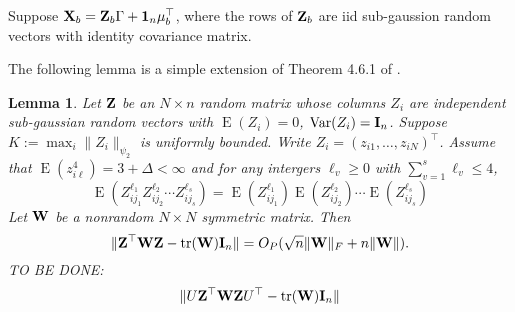 \documentclass[11pt]{article}
\DeclareMathOperator{\mytr}{tr}
\DeclareMathOperator{\myE}{E}
\DeclareMathOperator{\myVar}{Var}
\theoremstyle{plain}
\newtheorem{lemma}{\quad\quad Lemma}
\theoremstyle{definition}
\theoremstyle{remark}
\begin{document}
Suppose $\mathbf{X}_b =\mathbf{Z}_b \Gamma + \mathbf 1_n \mu_b^\top$, where the rows of $\mathbf{Z}_b$ are iid sub-gaussion random vectors with identity covariance matrix.


The following lemma is a simple extension of Theorem 4.6.1 of \cite{Roman2018}.
\begin{lemma}\label{lemma:con}
    Let $\mathbf{Z}$ be an $N\times n$ random matrix whose columns $Z_i$ are independent sub-gaussian random vectors with $\myE (Z_i)=0$, $\myVar (Z_i)= \BI_n$.
    Suppose $K:=\max_i \|Z_i\|_{\psi_2}$ is uniformly bounded.
    Write $Z_i=(z_{i1},\ldots,z_{iN})^\top$.
    Assume that $\myE (z_{i\ell}^4)=3 + \Delta <\infty$ and for any intergers $\ell_v \geq 0$ with $\sum_{v=1}^s \ell_v \leq 4$,
    \begin{equation*}
        \myE (Z_{i j_1}^{\ell_1}Z_{i j_2}^{\ell_2}\cdots Z_{i j_s}^{\ell_s}) 
        =
    \myE (Z_{i j_1}^{\ell_1})\myE (Z_{i j_2}^{\ell_2})\cdots \myE (Z_{i j_s}^{\ell_s}) 
    \end{equation*}
    Let $\mathbf{W}$ be a nonrandom $N \times N$ symmetric matrix.
    Then
    \begin{equation*}
        \|\BZ^\top \BW \BZ -\mytr (\BW) \BI_n\| 
        =
        O_P(\sqrt n \|\BW\|_F+ n \|\BW\|).
    \end{equation*}
    TO BE DONE: 
    \begin{equation*}
        \|U\BZ^\top \BW \BZ U^\top -\mytr (\BW) \BI_n\| 
    \end{equation*}
\end{lemma}
\end{document}
